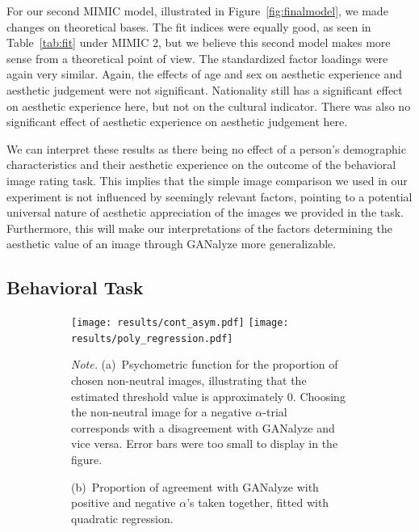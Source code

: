 \documentclass[../main.tex]{subfiles}
\begin{document}
For our second MIMIC model, illustrated in Figure~\ref{fig:finalmodel}, we made changes on theoretical bases. The fit indices were equally good, as seen in Table~\ref{tab:fit} under MIMIC 2, but we believe this second model makes more sense from a theoretical point of view. The standardized factor loadings were again very similar. Again, the effects of age and sex on aesthetic experience and aesthetic judgement were not significant. Nationality still has a significant effect on aesthetic experience here, but not on the cultural indicator. There was also no significant effect of aesthetic experience on aesthetic judgement here.



We can interpret these results as there being no effect of a person's demographic characteristics and their aesthetic experience on the outcome of the behavioral image rating task. This implies that the simple image comparison we used in our experiment is not influenced by seemingly relevant factors, pointing to a potential universal nature of aesthetic appreciation of the images we provided in the task. Furthermore, this will make our interpretations of the factors determining the aesthetic value of an image through GANalyze more generalizable.



\subsection{Behavioral Task}

\begin{figure}[!h]
	\caption{Behavioral Results from the Image Rating Task}
	\label{fig:psychometric_curves}
	\centering
	\begin{subfigure}{\textwidth}
		{\centering
			\texttt{[image: results/cont\_asym.pdf]}
			\hfill
			\texttt{[image: results/poly\_regression.pdf]}} \newline
		{\textit{Note.} (a)~Psychometric function for the proportion of chosen non-neutral images, illustrating that the estimated threshold value is approximately 0. Choosing the non-neutral image for a negative $\alpha$-trial corresponds with a disagreement with GANalyze and vice versa. Error bars were too small to display in the figure. \par (b)~Proportion of agreement with GANalyze with positive and negative $\alpha$'s taken together, fitted with quadratic regression.}
	\end{subfigure}
\end{figure}
\end{document}
